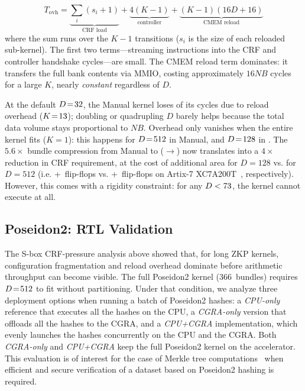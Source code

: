 {\small
\[
  T_{\mathrm{ovh}} = \underbrace{\textstyle\sum_{i}(s_i\!+\!1)}_{\text{CRF load}} + \underbrace{4(K\!-\!1)}_{\text{controller}} + \underbrace{(K\!-\!1)(16D\!+\!16)}_{\text{CMEM reload}}
\]
}
%
\noindent where the sum runs over the $K{-}1$ transitions ($s_i$ is the size of each reloaded sub-kernel). The first two terms---streaming instructions into the CRF and controller handshake cycles---are small. The CMEM reload term dominates: it transfers the full bank contents via MMIO, costing approximately $16NB$ cycles for a large $K$,
 nearly \emph{constant} regardless of $D$.

At the default $D\!=\!32$, the Manual kernel loses \pct{\MetricCrfManualDefaultOHPct} of its cycles due to reload overhead ($K\!=\!13$); doubling or quadrupling $D$ barely helps because the total data volume stays proportional to $NB$. Overhead only vanishes when the entire kernel fits ($K\!=\!1$): this happens for $D\!=\!512$ in Manual, and $D\!=\!128$ in \castm{}. The $5.6\times$ bundle compression from Manual to \castm{} (\MetricSboxManualNB$\to$\MetricSboxCastmNB) now translates into a $4\times$ reduction in CRF requirement, at the cost of \pct{\MetricCrfOneTwentyEightAreaPct} additional area for $D=128$ vs. \pct{\MetricCrfFullFitAreaPct} for $D=512$ (i.e. +\MetricCrfOneTwentyEightExtraFlipFlops~flip-flops vs. +\MetricCrfFullFitExtraFlipFlops~flip-flops on Artix-7 XC7A200T~\cite{xheep}, respectively). However, this comes with a rigidity constraint: for any $D < 73$, the \castm{} kernel cannot execute at all.

\subsection{Poseidon2: RTL Validation}
\label{subsec:rtl-poseidon2}

The S-box CRF-pressure analysis above showed that, for long ZKP kernels, configuration fragmentation and reload overhead dominate before arithmetic throughput can become visible. The full Poseidon2 kernel (366~bundles) requires $D\!=\!512$ to fit without partitioning.
 Under that condition, we analyze three deployment options when running a batch of Poseidon2 hashes: a \textit{CPU-only} reference that executes all the hashes on the CPU, a \textit{CGRA-only} version that offloads all the hashes to the CGRA, and a \textit{CPU+CGRA} implementation, which evenly launches the hashes concurrently on the CPU and the CGRA. Both \textit{CGRA-only} and \textit{CPU+CGRA} keep the full Poseidon2 kernel on the accelerator. This evaluation is of interest for the case of Merkle tree computations~\cite{hashemall} when efficient and secure verification of a dataset based on Poseidon2 hashing is required.

